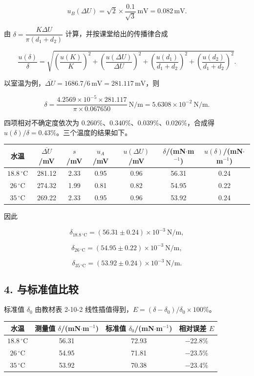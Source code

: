 \[
u_B(\Delta U)=\sqrt2\times\frac{0.1}{\sqrt3}\,\mathrm{mV}=0.082\,\mathrm{mV}.
\]

由 $\delta=\dfrac{K\Delta U}{\pi(d_1+d_2)}$ 计算，并按课堂给出的传播律合成

\[
\frac{u(\delta)}{\delta}=\sqrt{\left(\frac{u(K)}{K}\right)^{2}+\left(\frac{u(\Delta U)}{\Delta U}\right)^{2}+\left(\frac{u(d_1)}{d_1+d_2}\right)^{2}+\left(\frac{u(d_2)}{d_1+d_2}\right)^{2}}.
\]

以室温为例，$\overline{\Delta U}=1686.7/6\,\mathrm{mV}=281.117\,\mathrm{mV}$，则

\[
\delta=\frac{4.2569\times10^{-5}\times281.117}{\pi\times0.067650}\ \mathrm{N/m}=5.6308\times10^{-2}\ \mathrm{N/m}.
\]

四项相对不确定度依次为 $0.260\%$、$0.340\%$、$0.039\%$、$0.026\%$，合成得 $u(\delta)/\delta=0.43\%$。三个温度的结果如下。

\begin{center}\small
\begin{tabular}{ccccccc}
\toprule
水温 & $\overline{\Delta U}$/mV & $s$/mV & $u_A$/mV & $u(\Delta U)$/mV & $\delta$/(mN$\cdot$m$^{-1}$) & $u(\delta)$/(mN$\cdot$m$^{-1}$) \\
\midrule
$18.8\,{}^\circ\mathrm{C}$ & 281.12 & 2.33 & 0.95 & 0.96 & 56.31 & 0.24 \\
$26\,{}^\circ\mathrm{C}$ & 274.32 & 1.99 & 0.81 & 0.82 & 54.95 & 0.22 \\
$35\,{}^\circ\mathrm{C}$ & 269.22 & 2.33 & 0.95 & 0.96 & 53.92 & 0.24 \\
\bottomrule\end{tabular}\end{center}

因此

\[
\delta_{18.8\,{}^\circ\mathrm{C}}=(56.31\pm0.24)\times10^{-3}\ \mathrm{N/m},
\]

\[
\delta_{26\,{}^\circ\mathrm{C}}=(54.95\pm0.22)\times10^{-3}\ \mathrm{N/m},
\]

\[
\delta_{35\,{}^\circ\mathrm{C}}=(53.92\pm0.24)\times10^{-3}\ \mathrm{N/m}.
\]

\subsection*{4. 与标准值比较}

标准值 $\delta_0$ 由教材表 2-10-2 线性插值得到，$E=(\delta-\delta_0)/\delta_0\times100\%$。

\begin{center}\small
\begin{tabular}{cccc}
\toprule
水温 & 测量值 $\delta$/(mN$\cdot$m$^{-1}$) & 标准值 $\delta_0$/(mN$\cdot$m$^{-1}$) & 相对误差 $E$ \\
\midrule
$18.8\,{}^\circ\mathrm{C}$ & 56.31 & 72.93 & −22.8\% \\
$26\,{}^\circ\mathrm{C}$ & 54.95 & 71.81 & −23.5\% \\
$35\,{}^\circ\mathrm{C}$ & 53.92 & 70.38 & −23.4\% \\
\bottomrule\end{tabular}\end{center}

